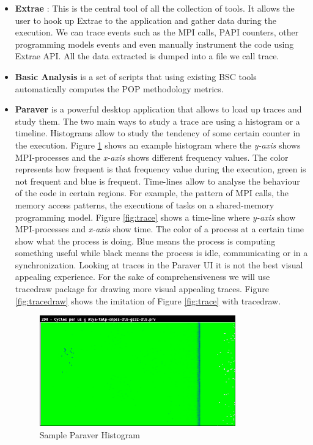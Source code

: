 \begin{itemize}
  \item \textbf{Extrae} \cite{extraeTools}: This is the central tool of all the collection of tools. It allows the user to hook up Extrae to the application and gather data during the execution. We can trace events such as the MPI calls, PAPI \cite{papi}  counters, other programming models events and even manually instrument the code using Extrae API. All the data extracted is dumped into a file we call trace.
  \item \textbf{Basic Analysis} is a set of scripts that using existing BSC tools automatically computes the POP methodology metrics.
  \item \textbf{Paraver} \cite{paraverPaper} \cite{paraverWeb} is a powerful desktop application that allows to load up traces and study them. The two main ways to study a trace are using a histogram or a timeline. Histograms allow to study the tendency of some certain counter in the execution. Figure \ref{fig:hist} shows an example histogram where the \textit{y-axis} shows MPI-processes and the \textit{x-axis} shows different frequency values. The color represents how frequent is that frequency value during the execution, green is not frequent and blue is frequent. Time-lines allow to analyse the behaviour of the code in certain regions. For example, the pattern of MPI calls, the memory access patterns, the executions of tasks on a shared-memory programming model. Figure \ref{fig:trace} shows a time-line where \textit{y-axis} show MPI-processes and \textit{x-axis} show time. The color of a process at a certain time show what the process is doing. Blue means the process is computing something useful while black means the process is idle, communicating or in a synchronization. Looking at traces in the Paraver UI it is not the best visual appealing experience. For the sake of comprehensiveness we will use tracedraw \cite{tracedraw} package for drawing more visual appealing traces. Figure \ref{fig:tracedraw} shows the imitation of Figure \ref{fig:trace} with tracedraw.

    \begin{figure}[htbp]
      \centering
      \includegraphics[width=0.8\textwidth]{sample_histogram}
      \caption{Sample Paraver Histogram}
      \label{fig:hist}
    \end{figure}


\end{itemize}
